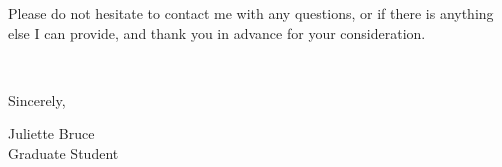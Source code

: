 \documentclass[11pt]{article}
\begin{document}
Please do not hesitate to contact me with any questions, or if there is anything else I can provide, and thank you in advance for your consideration. 

\vspace{24pt}
\noindent
\begin{minipage}{0.99\textwidth}
\begin{minipage}{0.69\textwidth}
\textcolor{white}{.}
\end{minipage}
\begin{minipage}{0.29\textwidth}
Sincerely, 

\vspace{36pt}
Juliette Bruce\\
Graduate Student
\end{minipage}
\end{minipage}

\end{document}
